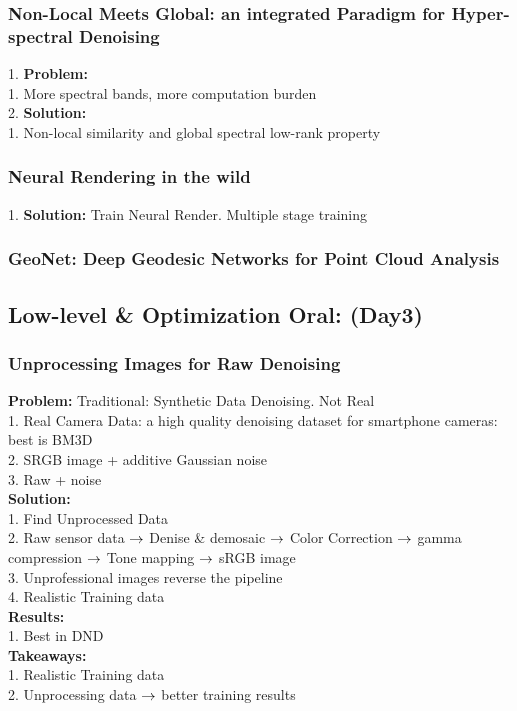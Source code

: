 \subsubsection{Non-Local Meets Global: an integrated Paradigm for Hyper-spectral Denoising}
    1. {\bf Problem:}  \\
        1. More spectral bands, more computation burden \\
    2. {\bf Solution:}  \\
        1. Non-local similarity and global spectral low-rank property \\
\subsubsection{Neural Rendering in the wild}
    1. {\bf Solution:} Train Neural Render. Multiple stage training \\
\subsubsection{GeoNet: Deep Geodesic Networks for Point Cloud Analysis}
\subsection{Low-level \& Optimization Oral: (Day3)}
\subsubsection{Unprocessing Images for Raw Denoising}
{\bf Problem:} Traditional: Synthetic Data Denoising. Not Real \\
        1. Real Camera Data: a high quality denoising dataset for smartphone cameras: best is BM3D \\
        2. SRGB image + additive Gaussian noise \\
        3. Raw + noise\\
{\bf {\bf Solution:}} \\
        1. Find Unprocessed Data \\
        2. Raw sensor data $\rightarrow$ Denise \& demosaic $\rightarrow$ Color Correction $\rightarrow$ gamma compression $\rightarrow$ Tone mapping $\rightarrow$ sRGB image \\
        3. Unprofessional images reverse the pipeline \\
        4. Realistic Training data\\
{\bf Results:} \\
        1. Best in DND\\
{\bf Takeaways:} \\
        1. Realistic Training data \\
        2. Unprocessing data $\rightarrow$ better training results \\
